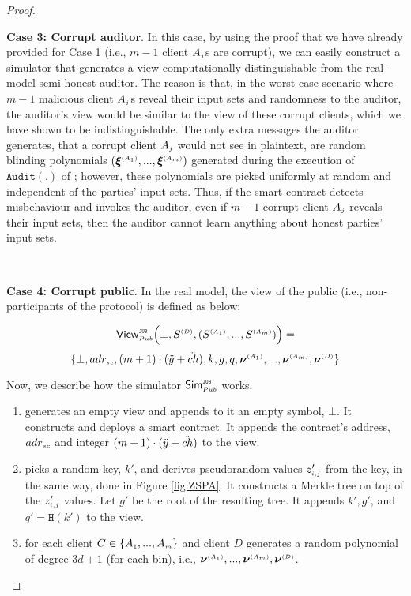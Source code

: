 \begin{proof}
 
 \

\noindent\textbf{Case 3: Corrupt auditor}.  In this case, by using the proof that we have already provided for Case 1 (i.e.,  $m-1$ client $A_{\scriptscriptstyle j}$s are corrupt), we can easily construct a simulator that generates a view computationally distinguishable from the real-model semi-honest auditor. 
 The reason is that, in the worst-case scenario where $m-1$ malicious client $A_{\scriptscriptstyle j}$s reveal their input sets and randomness to the auditor, the auditor's view would be similar to the view of these corrupt clients, which we have shown to be indistinguishable. The only extra messages the auditor generates, that a corrupt client $A_{\scriptscriptstyle j}$ would not see in plaintext, are random blinding polynomials $(\bm\xi^{\scriptscriptstyle (A_1)},..., \bm\xi^{\scriptscriptstyle (A_m)})$ generated during the execution of $\mathtt{Audit}(.)$ of \zspaa; however, these polynomials are picked uniformly at random and independent of the parties' input sets. Thus, if the smart contract detects misbehaviour and invokes the auditor, even if $m-1$ corrupt client $A_{\scriptscriptstyle j}$ reveals their input sets, then the auditor cannot learn anything about honest parties' input sets.    
 
 \

\noindent\textbf{Case 4: Corrupt public}. In the real model, the view of the public (i.e., non-participants of the protocol) is defined as below: 
 

 $$ \mathsf{View}_{\scriptscriptstyle Pub}^{\scriptscriptstyle \mathtt{JUS}} \Big(\bot, S^{\scriptscriptstyle (D)},(S^{\scriptscriptstyle (A_1)},..., S^{\scriptscriptstyle (A_m)})\Big)=$$ $$ \{\bot, adr_{\scriptscriptstyle sc}, (m+1)\cdot(\ddot{y}+\ddot{ch}), k, g, q, \bm\nu^{\scriptscriptstyle (A_1)},..., \bm\nu^{\scriptscriptstyle (A_m)}, \bm\nu^{\scriptscriptstyle (D)}\}$$
 
 
 Now, we describe how the simulator $\mathsf{Sim}^{\scriptscriptstyle \mathtt{JUS}}_{\scriptscriptstyle Pub}$  works. 
 
 \begin{enumerate}
 \item generates an empty view and appends to it an empty symbol, $\bot$. It constructs and deploys a smart contract. It appends the contract's address, $  {adr}_{\scriptscriptstyle sc}$ and integer $(m+1)\cdot(\ddot{y}+\ddot{ch})$ to the view.
\item picks a random key, $  k'$, and derives pseudorandom values $z'_{\scriptscriptstyle i,j}$ from the key,  in the same way, done in Figure \ref{fig:ZSPA}. It constructs a Merkle tree on top of the $z'_{\scriptscriptstyle i, j}$ values. Let $g'$ be the root of the resulting tree. It appends $  k', g'$, and $q' = \mathtt{H}(  k')$ to the view. 
%
\item for each client $C\in \{  {  A}_{ \scriptscriptstyle {   1}}, ...,   {  A}_{ \scriptscriptstyle {   m}}\}$ and client $D$ generates a random polynomial of degree $3d+1$ (for each bin), i.e.,  $ {\bm\nu}^{\scriptscriptstyle (A_1)}, ...,  {\bm\nu}^{\scriptscriptstyle (A_m)},  {\bm\nu}^{\scriptscriptstyle (D)}$. 
 \end{enumerate}
 

\end{proof}

